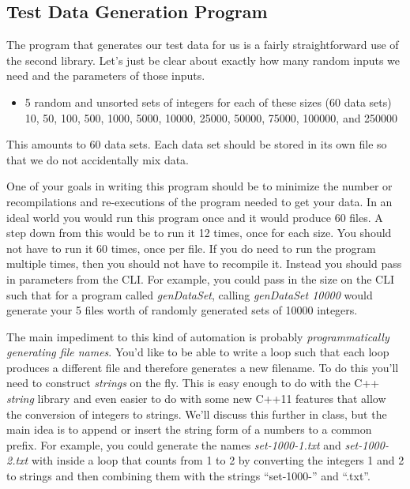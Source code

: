 \documentclass[]{tufte-handout}
\begin{document}
\subsection{Test Data Generation Program}

The program that generates our test data for us is a fairly straightforward use of the second library. Let's just be clear about exactly how many random inputs we need and the parameters of those inputs.
\begin{itemize}
\item 5 random and unsorted sets of integers for each of these sizes (60 data sets) \\
10, 50, 100, 500, 1000, 5000, 10000, 25000, 50000, 75000, 100000, and 250000
\end{itemize} 
This amounts to 60 data sets.  Each data set should be stored in its own file so that we do not accidentally mix data.

One of your goals in writing this program should be to minimize the number or recompilations and re-executions of the program needed to get your data. In an ideal world you would run this program once and it would produce 60 files. A step down from this would be to run it 12 times, once for each size. You should not have to run it 60 times, once per file. If you do need to run the program multiple times, then you should not have to recompile it.  Instead you should pass in parameters from the CLI. For example, you could pass in the size on the CLI such that for a program called \textit{genDataSet}, calling \textit{genDataSet 10000} would generate your 5 files worth of randomly generated sets of 10000 integers.  

The main impediment to this kind of automation is probably \textit{programmatically generating file names}.  You'd like to be able to write a loop such that each loop produces a different file and therefore generates a new filename. To do this you'll need to construct \textit{strings} on the fly. This is easy enough to do with the C++ \textit{string} library and even easier to do with some new C++11 features that allow the conversion of integers to strings. We'll discuss this further in class, but the main idea is to  append or insert the string form of a numbers to a common prefix. For example, you could generate the names \textit{set-1000-1.txt} and \textit{set-1000-2.txt} with inside a loop that counts from 1 to 2 by converting the integers 1 and 2 to strings and then combining them with the strings ``set-1000-'' and ``.txt''.  
\end{document}
